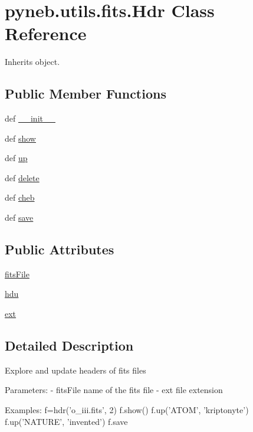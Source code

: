 \hypertarget{classpyneb_1_1utils_1_1fits_1_1_hdr}{\section{pyneb.\-utils.\-fits.\-Hdr Class Reference}
\label{classpyneb_1_1utils_1_1fits_1_1_hdr}
}


Inherits object.

\subsection*{Public Member Functions}
\begin{DoxyCompactItemize}
\item 
def \hyperlink{classpyneb_1_1utils_1_1fits_1_1_hdr_a154b37ae24e96d14ffff5e878fbb1760}{\-\_\-\-\_\-init\-\_\-\-\_\-}
\item 
def \hyperlink{classpyneb_1_1utils_1_1fits_1_1_hdr_a956d2cda7ca4e515f4a5dfaf0f6c465a}{show}
\item 
def \hyperlink{classpyneb_1_1utils_1_1fits_1_1_hdr_a52ee04bb03279ed65bbd5412154d08e2}{up}
\item 
def \hyperlink{classpyneb_1_1utils_1_1fits_1_1_hdr_adffa3ce71f4ab2b1f0428a9fa6fee117}{delete}
\item 
def \hyperlink{classpyneb_1_1utils_1_1fits_1_1_hdr_ae3914322f5f8fa906d003987bb4dfb9a}{cheb}
\item 
def \hyperlink{classpyneb_1_1utils_1_1fits_1_1_hdr_a81eb3b4cdfcc302e40f447eb399a60e1}{save}
\end{DoxyCompactItemize}
\subsection*{Public Attributes}
\begin{DoxyCompactItemize}
\item 
\hyperlink{classpyneb_1_1utils_1_1fits_1_1_hdr_a7c4dc491907edb52649262563df2e23c}{fits\-File}
\item 
\hyperlink{classpyneb_1_1utils_1_1fits_1_1_hdr_a23de98701ac30e7c56654f92d9956fca}{hdu}
\item 
\hyperlink{classpyneb_1_1utils_1_1fits_1_1_hdr_a1c2f102effab05a497e3a21ed3291359}{ext}
\end{DoxyCompactItemize}


\subsection{Detailed Description}
\begin{DoxyVerb}Explore and update headers of fits files

Parameters:
    - fitsFile  name of the fits file
    - ext       file extension

Examples:
    f=hdr('o_iii.fits', 2)
    f.show()
    f.up('ATOM', 'kriptonyte')
    f.up('NATURE', 'invented')
    f.save\end{DoxyVerb}
 

